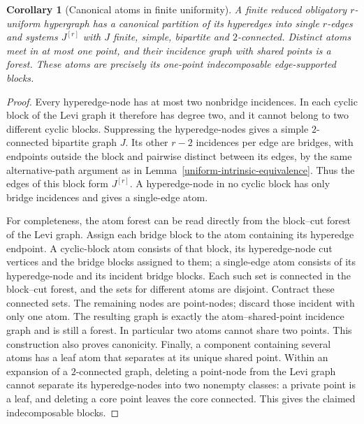 \documentclass[a4paper,11pt,reqno]{amsart}
\theoremstyle{plain}
\newtheorem{corollary}[theorem]{Corollary}
\theoremstyle{definition}
\theoremstyle{remark}
\begin{document}
\begin{corollary}[Canonical atoms in finite uniformity]
\label{uniform-canonical-atoms}
A finite reduced obligatory $r$-uniform hypergraph has a canonical
partition of its hyperedges into single $r$-edges and systems $J^{[r]}$
with $J$ finite, simple, bipartite and $2$-connected.  Distinct atoms meet
in at most one point, and their incidence graph with shared points is a
forest.  These atoms are precisely its one-point indecomposable
edge-supported blocks.
\end{corollary}
\begin{proof}
Every hyperedge-node has at most two nonbridge incidences.  In each cyclic
block of the Levi graph it therefore has degree two, and it cannot
belong to two different cyclic blocks.  Suppressing the hyperedge-nodes
gives a simple $2$-connected bipartite graph $J$.  Its other $r-2$
incidences per edge are bridges, with endpoints outside the block and
pairwise distinct between its edges, by the same alternative-path
argument as in Lemma~\ref{uniform-intrinsic-equivalence}.  Thus the
edges of this block form $J^{[r]}$.  A hyperedge-node in no cyclic block
has only bridge incidences and gives a single-edge atom.

For completeness, the atom forest can be read directly from the
block--cut forest of the Levi graph.  Assign each bridge block to the
atom containing its hyperedge endpoint.  A cyclic-block atom consists
of that block, its hyperedge-node cut vertices and the bridge blocks
assigned to them; a single-edge atom consists of its hyperedge-node
and its incident bridge blocks.  Each such set is connected in the
block--cut forest, and the sets for different atoms are disjoint.
Contract these connected sets.  The remaining nodes are point-nodes;
discard those incident with only one atom.  The resulting graph is
exactly the atom--shared-point incidence graph and is still a forest.
In particular two atoms cannot share two points.  This construction
also proves canonicity.  Finally, a component containing several atoms
has a leaf atom that separates at its unique shared point.  Within an
expansion of a $2$-connected graph, deleting a point-node from the Levi
graph cannot separate its hyperedge-nodes into two nonempty classes:
a private point is a leaf, and deleting a core point leaves the core
connected.  This gives the claimed indecomposable blocks.
\end{proof}
\end{document}
